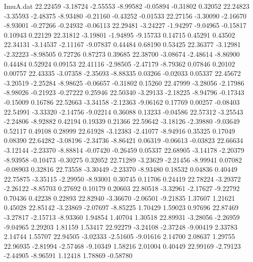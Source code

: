 \begin{filecontents}{ImuA.dat}
  22.22459   -3.18724   -2.55553   -8.99582   -0.05894   -0.31802    0.32052
  22.24823   -3.35593   -2.48375   -8.93480   -0.21160   -0.43252   -0.01533
  22.27156   -3.30090   -2.16670   -8.93001   -0.27266   -0.24932   -0.06113
  22.29481   -3.24227   -1.94297   -9.04965   -0.15817    0.10943    0.22129
  22.31812   -3.19801   -1.94895   -9.15733    0.14715    0.45291    0.43502
  22.34131   -3.14537   -2.11167   -9.07837    0.44484    0.68190    0.53425
  22.36377   -3.12981   -2.32223   -8.98505    0.72726    0.87273    0.39685
  22.38700   -3.08674   -2.48614   -8.86900    0.44484    0.52924    0.09153
  22.41116   -2.98505   -2.47179   -8.79362    0.07846    0.20102    0.00757
  22.43335   -3.07358   -2.35693   -8.88335    0.03266   -0.02033    0.05337
  22.45672   -3.20519   -2.25284   -8.98625   -0.06657   -0.31802    0.15260
  22.47999   -3.28056   -2.17986   -8.98026   -0.21923   -0.27222    0.25946
  22.50340   -3.29133   -2.18225   -8.94796   -0.17343   -0.15009    0.16786
  22.52663   -3.34158   -2.12363   -9.06162    0.17769    0.00257   -0.08403
  22.54991   -3.33320   -2.14756   -9.02214    0.36088    0.13233   -0.04586
  22.57312   -3.25543   -2.24806   -8.92882    0.42194    0.19339    0.21366
  22.59642   -3.18126   -2.39880   -9.03649    0.52117    0.49108    0.28999
  22.61928   -3.12383   -2.41077   -8.94916    0.35325    0.17049    0.08390
  22.64282   -3.08196   -2.34736   -8.86421    0.06319   -0.06613   -0.03823
  22.66634   -3.12144   -2.23370   -8.88814   -0.07420   -0.26459    0.05337
  22.68905   -3.14178   -2.20379   -8.93958   -0.10473   -0.30275    0.32052
  22.71289   -3.23629   -2.21456   -8.99941    0.07082   -0.08903    0.32816
  22.73558   -3.30449   -2.23370   -8.93480    0.18532    0.04836    0.40449
  22.75875   -3.35115   -2.29950   -8.93001    0.30745    0.11706    0.24419
  22.78224   -3.29372   -2.26122   -8.85703    0.27692    0.10179    0.20603
  22.80518   -3.32961   -2.17627   -9.22792    0.70436    0.42238    0.22893
  22.82940   -3.36670   -2.06501   -9.21835    1.37607    1.21621    0.45028
  22.85142   -3.23869   -2.07697   -8.85225    1.70429    1.59023    0.97696
  22.87469   -3.27817   -2.15713   -8.93360    1.94854    1.40704    1.30518
  22.89931   -3.28056   -2.26959   -9.04965    2.29203    1.81159    1.53417
  22.92279   -3.24108   -2.37248   -9.00419    2.33783    2.14744    1.55707
  22.94505   -3.02333   -2.51605   -9.01616    2.14700    2.08637    1.29755
  22.96935   -2.81994   -2.57468   -9.10349    1.58216    2.01004    0.40449
  22.99169   -2.79123   -2.44905   -8.96591    1.12418    1.78869   -0.58780

\end{filecontents}
